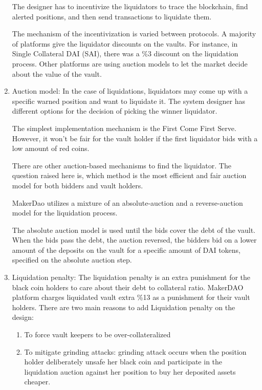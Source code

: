 \begin{enumerate}
The designer has to incentivize the liquidators to trace the blockchain, find alerted positions, and then send transactions to liquidate them. 

The mechanism of the incentivization is varied between protocols. A majority of platforms give the liquidator discounts on the vaults. For instance, in Single Collateral DAI (SAI), there was a \%3 discount on the liquidation process. Other platforms are using auction models to let the market decide about the value of the vault. 
  
  \item Auction model:
In the case of liquidations,  liquidators may come up with a specific warned position and want to liquidate it. The system designer has different options for the decision of picking the winner liquidator.
 
The simplest implementation mechanism is the First Come First Serve. However, it won't be fair for the vault holder if the first liquidator bids with a low amount of red coins.

There are other auction-based mechanisms to find the liquidator. The question raised here is, which method is the most efficient and fair auction model for both bidders and vault holders.

MakerDao utilizes a mixture of an absolute-auction and a reverse-auction model for the liquidation process.

The absolute auction model is used until the bids cover the debt of the vault. When the bids pass the debt, the auction reversed, the bidders bid on a lower amount of the deposits on the vault for a specific amount of DAI tokens, specified on the absolute auction step.
  
  \item Liquidation penalty:
The liquidation penalty is an extra punishment for the black coin holders to care about their debt to collateral ratio.
MakerDAO platform charges liquidated vault extra \%13 as a punishment for their vault holders. There are two main reasons to add Liquidation penalty on the design:

\begin{enumerate}

  \item To force vault keepers to be over-collateralized
  \item To mitigate grinding attacks: grinding attack occurs when the position holder deliberately unsafe her black coin and participate in the liquidation auction against her position to buy her deposited assets cheaper.

\end{enumerate}
\end{enumerate}


